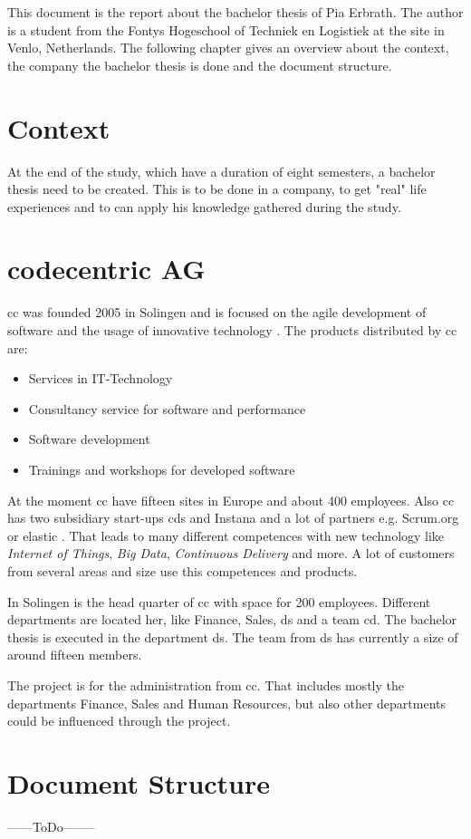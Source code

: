 This document is the report about the bachelor thesis of Pia Erbrath. The author is a student from the Fontys Hogeschool of Techniek en Logistiek at the site in Venlo, Netherlands. The following chapter gives an overview about the context, the company the bachelor thesis is done and the document structure.

\section{Context}
At the end of the study, which have a duration of eight semesters, a bachelor thesis need to be created. This is to be done in a company, to get "real" life experiences and to can apply his knowledge gathered during the study.  

\section{codecentric AG}
\Gls{cc} was founded 2005 in Solingen and is focused on the agile development of software and the usage of innovative technology \parencite{codecentric2018unternehmen}. The products distributed by \gls{cc} are: 
\begin{itemize}
	\item Services in \gls{IT}-Technology
	\item Consultancy service for software and performance
	\item Software development
	\item Trainings and workshops for developed software
\end{itemize}
At the moment \gls{cc} have fifteen sites in Europe and about 400 employees. Also \gls{cc} has two subsidiary start-ups \glspl{cd} and Instana \parencite{codecentric2018startups} and a lot of partners e.g. Scrum.org or elastic \parencite{codecentric2018partner}.
That leads to many different competences with new technology like \textit{Internet of Things}, \textit{Big Data}, \textit{Continuous Delivery} and more.
A lot of customers from several areas and size use this competences and products.

In Solingen is the head quarter of \gls{cc} with space for 200 employees. Different departments are located her, like Finance, Sales, \gls{ds} and a team \gls{cd}.   
The bachelor thesis is executed in the department \gls{ds}. The team from \gls{ds} has currently a size of around fifteen members.

The project is for the administration from \gls{cc}. That includes mostly the departments Finance, Sales and Human Resources, but also other departments could be influenced through the project.

\section{Document Structure}
------ToDo--------